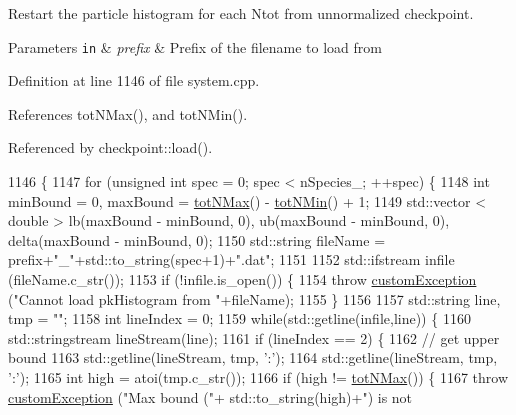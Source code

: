 Restart the particle histogram for each Ntot from unnormalized checkpoint. 


\begin{DoxyParams}[1]{Parameters}
\mbox{\tt in}  & {\em prefix} & Prefix of the filename to load from \\
\hline
\end{DoxyParams}


Definition at line 1146 of file system.\-cpp.



References tot\-N\-Max(), and tot\-N\-Min().



Referenced by checkpoint\-::load().


\begin{DoxyCode}
1146                                                           \{
1147     \textcolor{keywordflow}{for} (\textcolor{keywordtype}{unsigned} \textcolor{keywordtype}{int} spec = 0; spec < nSpecies\_; ++spec) \{
1148         \textcolor{keywordtype}{int} minBound = 0, maxBound = \hyperlink{classsim_system_aee2c65ecb43a35c0c4d070cdb45f7dc0}{totNMax}() - \hyperlink{classsim_system_af10842e0eaa638373b8717c87b47e6bc}{totNMin}() + 1;
1149         std::vector < double > lb(maxBound - minBound, 0), ub(maxBound - minBound, 0), delta(maxBound - 
      minBound, 0);
1150         std::string fileName = prefix+\textcolor{stringliteral}{"\_"}+std::to\_string(spec+1)+\textcolor{stringliteral}{".dat"};
1151 
1152         std::ifstream infile (fileName.c\_str());
1153         \textcolor{keywordflow}{if} (!infile.is\_open()) \{
1154             \textcolor{keywordflow}{throw} \hyperlink{classcustom_exception}{customException} (\textcolor{stringliteral}{"Cannot load pkHistogram from "}+fileName);
1155         \}
1156 
1157         std::string line, tmp = \textcolor{stringliteral}{""};
1158         \textcolor{keywordtype}{int} lineIndex = 0;
1159         \textcolor{keywordflow}{while}(std::getline(infile,line)) \{
1160             std::stringstream lineStream(line);
1161             \textcolor{keywordflow}{if} (lineIndex == 2) \{
1162                 \textcolor{comment}{// get upper bound}
1163                 std::getline(lineStream, tmp, \textcolor{charliteral}{':'});
1164                 std::getline(lineStream, tmp, \textcolor{charliteral}{':'});
1165                 \textcolor{keywordtype}{int} high = atoi(tmp.c\_str());
1166                 \textcolor{keywordflow}{if} (high != \hyperlink{classsim_system_aee2c65ecb43a35c0c4d070cdb45f7dc0}{totNMax}()) \{
1167                     \textcolor{keywordflow}{throw} \hyperlink{classcustom_exception}{customException} (\textcolor{stringliteral}{"Max bound ("}+ std::to\_string(high)+\textcolor{stringliteral}{") is not
}
\end{DoxyCode}
